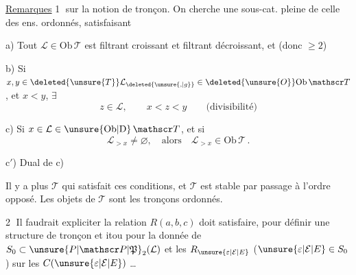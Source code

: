 \uline{Remarques} \textcircled{1}  sur la notion de tronçon. On cherche une sous-cat. pleine  de celle des ens. ordonnés, satisfaisant

a) Tout $\mathcal L\in\mathrm{Ob}\,\mathscr T$ est filtrant croissant et filtrant décroissant, et   (donc $\geq2$)

b) Si $x,y\in\deleted{\unsure{T}}\mathcal L_{\deleted{\unsure{,|g}}}\in\deleted{\unsure{O}}\mathrm{Ob}\,\mathscr T$, et $x<y$, $\exists$
\[
 z\in\mathcal L,\qquad x<z<y\qquad\text{(divisibilité)}
\]

c) Si $x\in\mathcal L\in\unsure{\mathrm{Ob}|\mathrm D}\,\mathscr T$,  et si
\[
 \mathcal L_{>x}\ne\varnothing,\quad\text{alors}\quad \mathcal L_{>x}\in\mathrm{Ob}\,\mathscr T\,.
\]

c$'$) Dual de c)

Il y a  plus  $\mathscr T$ qui satisfait ces conditions, et $\mathscr T$ est stable par passage à l'ordre opposé. Les objets de $\mathscr T$ sont les tronçons ordonnés.

\textcircled{2} Il faudrait expliciter   la relation $R(a,b,c)$ doit satisfaire, pour définir une structure de tronçon \unsure{,} et itou pour la donnée de $S_0\subset\unsure{P|\mathscr P|\mathfrak P}_2(\mathcal L)$ et les $R_{\unsure{\varepsilon|\mathcal E|E}}$\unsure{,} ($\unsure{\varepsilon|\mathcal E|E}\in S_0$) sur les $C(\unsure{\varepsilon|\mathcal E|E})$ \ldots

